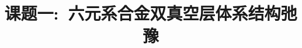 \documentclass[10pt,a4paper]{article}
\begin{document}
\graphicspath{{Figures/}}
%
\renewcommand{\abstractname}{\small{\CJKfamily{hei} 摘\quad 要}} %
\renewcommand{\refname}{\centering\CJKfamily{hei} 参考文献}
\renewcommand{\figurename}{{\bf Fig}.}
\renewcommand{\tablename}{{\bf Tab}.}

\makeatletter
\long{}
\makeatother

\newcommand{\keywords}[1]{{\hspace{0\ccwd}\small{\CJKfamily{hei} 关键词:}{\hspace{2ex}{#1}}\bigskip}}



\title{课题一:~六元系合金双真空层体系结构弛豫}

\author{
\small
\small
}
\date{}					%
\maketitle
\end{document}
